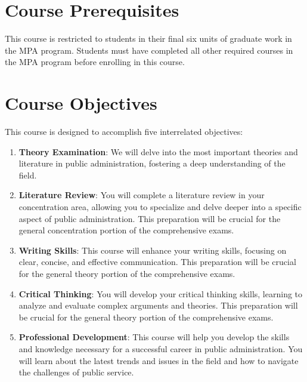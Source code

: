 \documentclass[11pt, letterpaper]{article}
\begin{document}
                    \section{Course Prerequisites}
                    This course is restricted to students in their final six units of graduate work in the MPA program. Students must have completed all other required courses in the MPA program before enrolling in this course.
                    
                    \section{Course Objectives}
                    This course is designed to accomplish five interrelated objectives:
                    
                    \begin{enumerate}
                            \item \textbf{Theory Examination}: We will delve into the most important theories and literature in public administration, fostering a deep understanding of the field.
                            \item \textbf{Literature Review}: You will complete a literature review in your concentration area, allowing you to specialize and delve deeper into a specific aspect of public administration. This preparation will be crucial for the general concentration portion of the comprehensive exams.
                            \item \textbf{Writing Skills}: This course will enhance your writing skills, focusing on clear, concise, and effective communication. This preparation will be crucial for the general theory portion of the comprehensive exams.
                            \item \textbf{Critical Thinking}: You will develop your critical thinking skills, learning to analyze and evaluate complex arguments and theories. This preparation will be crucial for the general theory portion of the comprehensive exams.
                            \item \textbf{Professional Development}: This course will help you develop the skills and knowledge necessary for a successful career in public administration. You will learn about the latest trends and issues in the field and how to navigate the challenges of public service.
                    
                    \end{enumerate}
    
\end{document}
